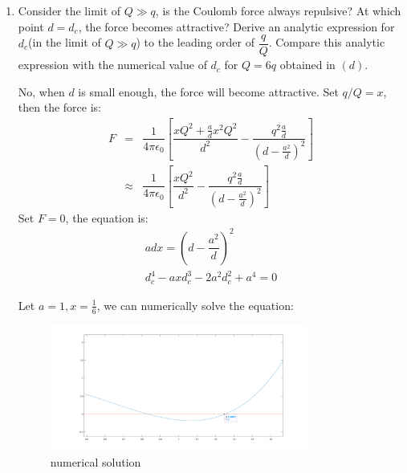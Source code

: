\documentclass[a4paper,11pt]{article}
\begin{document}
\begin{enumerate}
\begin{enumerate}
    \item Consider the limit of $Q\gg q$, is the Coulomb force always repulsive? At which point $d=d_c$, the force becomes attractive? Derive an analytic expression for $d_c$(in the limit of $Q\gg q$) to the leading order of $\dfrac{q}{Q}$. Compare this analytic expression with the numerical value of $d_c$ for $Q=6q$ obtained in $(d)$.
    
    No, when $d$ is small enough, the force will become attractive. Set $q/Q = x$, then the force is:
    \begin{eqnarray}
      F
      &=&\dfrac{1}{4\pi\epsilon_0}\left[\dfrac{xQ^2+\frac{a}{d}x^2Q^2}{d^2}-\dfrac{q^2\frac{a}{d}}{(d-\frac{a^2}{d})^2}\right]\nonumber\\
      &\approx& \dfrac{1}{4\pi\epsilon_0}\left[\dfrac{xQ^2}{d^2}-\dfrac{q^2\frac{a}{d}}{(d-\frac{a^2}{d})^2}\right]
    \end{eqnarray}
    Set $F=0$, the equation is:
    \begin{eqnarray}
      adx=(d-\dfrac{a^2}{d})^2 \nonumber \\
      d_c^4-axd_c^3-2a^2d_c^2+a^4=0
    \end{eqnarray}

    Let $a=1,x=\frac{1}{6}$, we can numerically solve the equation:
    \begin{figure}[h]
      \centering
      \includegraphics[width=0.8\textwidth]{fig5.png}\caption{numerical solution}
    \end{figure}
  \end{enumerate}


\end{enumerate}
\end{document}
